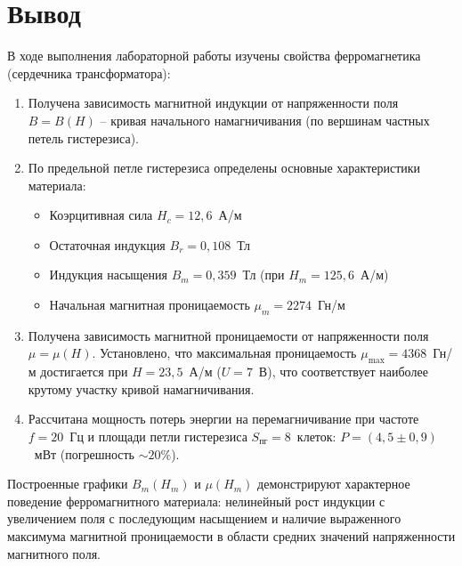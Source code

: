\newpage

\section{Вывод}

В ходе выполнения лабораторной работы изучены свойства ферромагнетика (сердечника трансформатора):

\begin{enumerate}
    \item Получена зависимость магнитной индукции от напряженности поля $B = B(H)$ -- кривая начального намагничивания (по вершинам частных петель гистерезиса).
    
    \item По предельной петле гистерезиса определены основные характеристики материала:
    \begin{itemize}
        \item Коэрцитивная сила $H_c = 12{,}6$~А/м
        \item Остаточная индукция $B_r = 0{,}108$~Тл
        \item Индукция насыщения $B_m = 0{,}359$~Тл (при $H_m = 125{,}6$~А/м)
        \item Начальная магнитная проницаемость $\mu_m = 2274$~Гн/м
    \end{itemize}
    
    \item Получена зависимость магнитной проницаемости от напряженности поля $\mu = \mu(H)$. 
    Установлено, что максимальная проницаемость $\mu_{\max} = 4368$~Гн/м 
    достигается при $H = 23{,}5$~А/м ($U = 7$~В), что соответствует наиболее крутому участку кривой намагничивания.
    
    \item Рассчитана мощность потерь энергии на перемагничивание при частоте $f = 20$~Гц 
    и площади петли гистерезиса $S_{\text{пг}} = 8$~клеток: 
    $P = (4{,}5 \pm 0{,}9)$~мВт (погрешность $\sim 20\%$).
\end{enumerate}

Построенные графики $B_m(H_m)$ и $\mu(H_m)$ демонстрируют характерное поведение 
ферромагнитного материала: нелинейный рост индукции с увеличением поля с последующим 
насыщением и наличие выраженного максимума магнитной проницаемости в области 
средних значений напряженности магнитного поля.